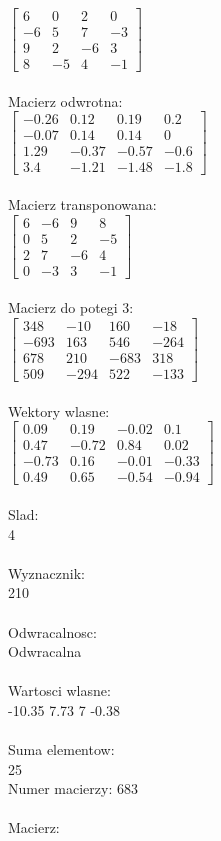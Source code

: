 \documentclass[a4paper,12pt]{article}
\begin{document}
$\begin{bmatrix} 6&0&2&0\\-6&5&7&-3\\9&2&-6&3\\8&-5&4&-1 \end{bmatrix}$
\\
\\
Macierz odwrotna:\\

$\begin{bmatrix} -0.26&0.12&0.19&0.2\\-0.07&0.14&0.14&0\\1.29&-0.37&-0.57&-0.6\\3.4&-1.21&-1.48&-1.8 \end{bmatrix}$
\\
\\
Macierz transponowana:\\

$\begin{bmatrix} 6&-6&9&8\\0&5&2&-5\\2&7&-6&4\\0&-3&3&-1 \end{bmatrix}$
\\
\\
Macierz do potegi 3:\\

$\begin{bmatrix} 348&-10&160&-18\\-693&163&546&-264\\678&210&-683&318\\509&-294&522&-133 \end{bmatrix}$
\\
\\
Wektory wlasne:\\

$\begin{bmatrix} 0.09&0.19&-0.02&0.1\\0.47&-0.72&0.84&0.02\\-0.73&0.16&-0.01&-0.33\\0.49&0.65&-0.54&-0.94 \end{bmatrix}$
\\
\\
Slad:\\
4
\\
\\
Wyznacznik:\\
210
\\
\\
Odwracalnosc:\\
Odwracalna
\\
\\
Wartosci wlasne:\\
-10.35 7.73 7 -0.38
\\
\\
Suma elementow:\\
25
\\
\newpage
Numer macierzy:
683
\\
\\
Macierz:\\
\end{document}
